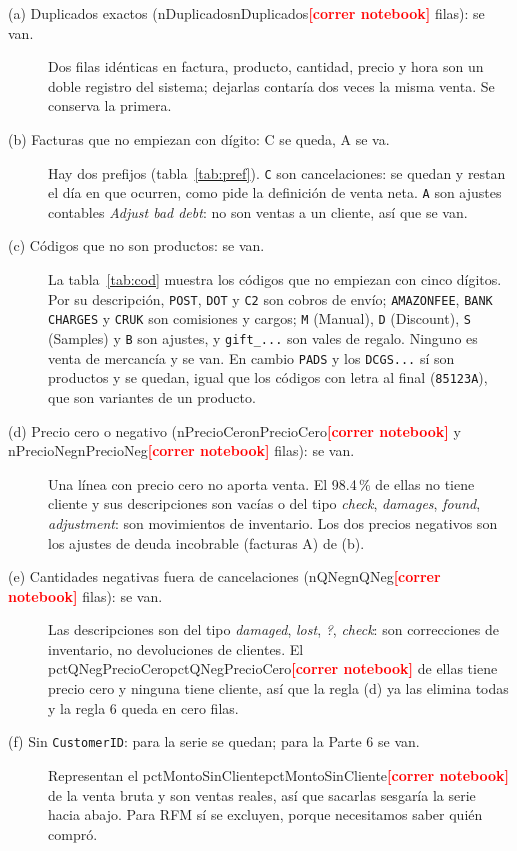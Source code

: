 \documentclass[11pt]{article}
\newcommand{\pendiente}{\textcolor{red}{\textbf{[correr notebook]}}}
\newcommand{\cf}[1]{\ifcsname #1\endcsname\csname #1\endcsname\else\pendiente\fi}
\begin{document}
\begin{description}
\item[(a) Duplicados exactos (\cf{nDuplicados} filas): se van.] Dos filas idénticas en factura, producto, cantidad,
precio y hora son un doble registro del sistema; dejarlas contaría dos veces la misma venta. Se conserva la primera.

\item[(b) Facturas que no empiezan con dígito: C se queda, A se va.] Hay dos prefijos (tabla~\ref{tab:pref}).
\texttt{C} son cancelaciones: se quedan y restan el día en que ocurren, como pide la definición de venta neta.
\texttt{A} son ajustes contables \emph{Adjust bad debt}: no son ventas a un cliente, así que se van.

\item[(c) Códigos que no son productos: se van.] La tabla~\ref{tab:cod} muestra los códigos que no empiezan con cinco
dígitos. Por su descripción, \texttt{POST}, \texttt{DOT} y \texttt{C2} son cobros de envío; \texttt{AMAZONFEE},
\texttt{BANK CHARGES} y \texttt{CRUK} son comisiones y cargos; \texttt{M} (Manual), \texttt{D} (Discount),
\texttt{S} (Samples) y \texttt{B} son ajustes, y \texttt{gift\_...} son vales de regalo. Ninguno es venta de
mercancía y se van. En cambio \texttt{PADS} y los \texttt{DCGS...} sí son productos y se quedan, igual que los
códigos con letra al final (\texttt{85123A}), que son variantes de un producto.

\item[(d) Precio cero o negativo (\cf{nPrecioCero} y \cf{nPrecioNeg} filas): se van.] Una línea con precio cero no
aporta venta. El 98.4\,\% de ellas no tiene cliente y sus descripciones son vacías o del tipo \emph{check},
\emph{damages}, \emph{found}, \emph{adjustment}: son movimientos de inventario. Los dos precios negativos son los
ajustes de deuda incobrable (facturas A) de (b).

\item[(e) Cantidades negativas fuera de cancelaciones (\cf{nQNeg} filas): se van.] Las descripciones son del tipo
\emph{damaged}, \emph{lost}, \emph{?}, \emph{check}: son correcciones de inventario, no devoluciones de clientes.
El \cf{pctQNegPrecioCero} de ellas tiene precio cero y ninguna tiene cliente, así que la regla (d) ya las elimina
todas y la regla 6 queda en cero filas.

\item[(f) Sin \texttt{CustomerID}: para la serie se quedan; para la Parte 6 se van.] Representan el
\cf{pctMontoSinCliente} de la venta bruta y son ventas reales, así que sacarlas sesgaría la serie hacia abajo.
Para RFM sí se excluyen, porque necesitamos saber quién compró.
\end{description}
\end{document}
